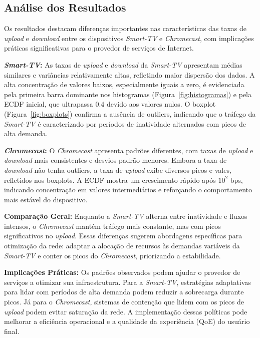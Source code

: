 \subsection{Análise dos Resultados}

Os resultados destacam diferenças importantes nas características das taxas de \textit{upload} e \textit{download} entre os dispositivos \textit{Smart-TV} e \textit{Chromecast}, com implicações práticas significativas para o provedor de serviços de Internet.

\textbf{\textit{Smart-TV}:} As taxas de \textit{upload} e \textit{download} da \textit{Smart-TV} apresentam médias similares e variâncias relativamente altas, refletindo maior dispersão dos dados. A alta concentração de valores baixos, especialmente iguais a zero, é evidenciada pela primeira barra dominante nos histogramas (Figura~\ref{fig:histogramas}) e pela ECDF inicial, que ultrapassa 0.4 devido aos valores nulos. O boxplot (Figura~\ref{fig:boxplots}) confirma a ausência de outliers, indicando que o tráfego da \textit{Smart-TV} é caracterizado por períodos de inatividade alternados com picos de alta demanda. 

\textbf{\textit{Chromecast}:} O \textit{Chromecast} apresenta padrões diferentes, com taxas de \textit{upload} e \textit{download} mais consistentes e desvios padrão menores. Embora a taxa de \textit{download} não tenha outliers, a taxa de \textit{upload} exibe diversos picos e vales, refletidos nos boxplots. A ECDF mostra um crescimento rápido após \(10^2\) bps, indicando concentração em valores intermediários e reforçando o comportamento mais estável do dispositivo.

\textbf{Comparação Geral:} Enquanto a \textit{Smart-TV} alterna entre inatividade e fluxos intensos, o \textit{Chromecast} mantém tráfego mais constante, mas com picos significativos no \textit{upload}. Essas diferenças sugerem abordagens específicas para otimização da rede: adaptar a alocação de recursos às demandas variáveis da \textit{Smart-TV} e conter os picos do \textit{Chromecast}, priorizando a estabilidade.

\textbf{Implicações Práticas:} Os padrões observados podem ajudar o provedor de serviços a otimizar sua infraestrutura. Para a \textit{Smart-TV}, estratégias adaptativas para lidar com períodos de alta demanda podem reduzir a sobrecarga durante picos. Já para o \textit{Chromecast}, sistemas de contenção que lidem com os picos de \textit{upload} podem evitar saturação da rede. A implementação dessas políticas pode melhorar a eficiência operacional e a qualidade da experiência (QoE) do usuário final.
